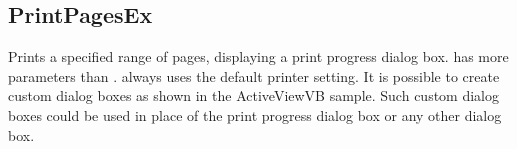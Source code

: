 \documentclass[letterpaper,12pt,english,openany,oneside]{sphinxmanual}
\begin{document}
\subsection{PrintPagesEx}
\label{\detokenize{IAC_API_OLE_Objects:printpagesex}}
Prints a specified range of pages, displaying a print progress dialog box.  has more parameters than .  always uses the default printer setting. It is possible to create custom dialog boxes as shown in the ActiveViewVB sample. Such custom dialog boxes could be used in place of the print progress dialog box or any other dialog box.


\begin{sphinxVerbatim}[commandchars=\\\{\}]
   
                    

                    

                    

                  
\end{sphinxVerbatim}
\label{\detokenize{IAC_API_OLE_Objects:parameters-26}}
\end{document}
